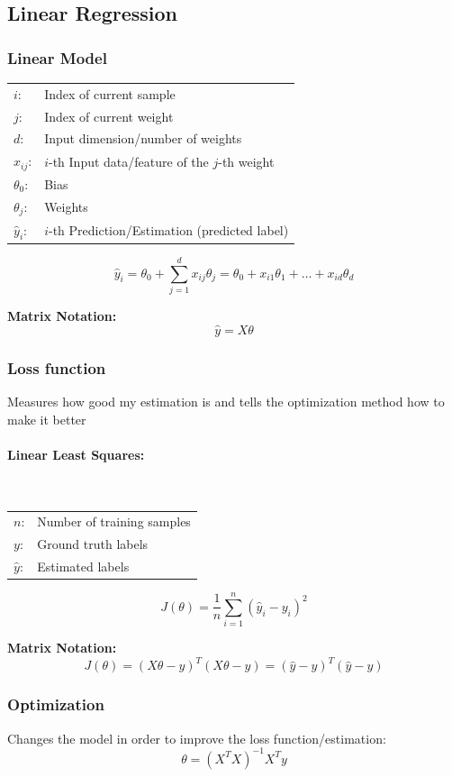 \documentclass[10pt,a4paper]{article}
\begin{document}
\subsection{Linear Regression}
\subsubsection{Linear Model}
\begin{tabular}{ll}
	$i$: & Index of current sample \\
	$j$: & Index of current weight \\
	$d$: & Input dimension/number of weights \\
	$x_{ij}$: & $i$-th Input data/feature of the $j$-th weight \\
	$\theta_0$: & Bias \\
	$\theta_j$: & Weights \\
	$\hat y_i$: & $i$-th Prediction/Estimation (predicted label)
\end{tabular}

$$
	\hat y_i = \theta_0 + \sum_{j = 1}^d x_{ij} \theta_j = \theta_0 + x_{i1} \theta_1 + \dots + x_{id} \theta_d
$$

\textbf{Matrix Notation:}
$$
	\hat y = X \theta
$$

\subsubsection{Loss function}
Measures how good my estimation is and tells the optimization method how to make it better

\paragraph{Linear Least Squares:} ~\\
\begin{tabular}{ll}
	$n$: & Number of training samples \\
	$y$: & Ground truth labels \\
	$\hat y$: & Estimated labels
\end{tabular}
$$
	J(\theta) = \frac 1 n \sum_{i = 1}^n (\hat y_i - y_i)^2
$$

\textbf{Matrix Notation:}
$$
	J(\theta) = (X \theta - y)^T (X \theta - y) = (\hat y - y)^T (\hat y - y)
$$

\subsubsection{Optimization}
Changes the model in order to improve the loss function/estimation:
$$
	\theta = (X^TX)^{-1}X^Ty
$$
\end{document}
